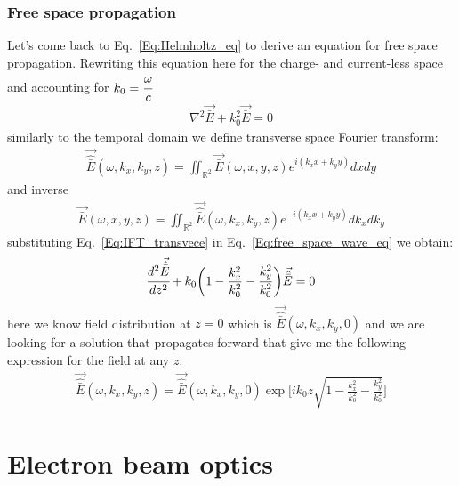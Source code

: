     \subsubsection{Free space propagation}
    Let's come back to Eq.~\ref{Eq:Helmholtz_eq} to derive an equation for free space propagation. Rewriting this equation here for the charge- and current-less space and accounting for $k_0 = \cfrac{\omega}{c}$
    \begin{align}
        \nabla^2 \vec{\bar{E}} + k_0^2 \vec{\bar{E}} = 0
        \label{Eq:free_space_wave_eq}
    \end{align}
    similarly to the temporal domain we define transverse space Fourier transform:
    \begin{align}
        \vec{\hat{\bar{E}}}(\omega, k_x, k_y, z) = \iint_{\mathbb{R}^2} \vec{\bar{E}}(\omega, x, y, z)e^{i (k_x x + k_y y)} dx dy
        \label{Eq:FT_transvece}
    \end{align}
    and inverse
    \begin{align}
        \vec{\bar{E}}(\omega, x, y, z) = \iint_{\mathbb{R}^2} \vec{\hat{\bar{E}}}(\omega, k_x, k_y, z) e^{-i (k_x x + k_y y)} dk_x dk_y
        \label{Eq:IFT_transvece}
    \end{align}
    substituting Eq.~\ref{Eq:IFT_transvece} in Eq.~\ref{Eq:free_space_wave_eq} we obtain:
    \begin{align}
        \cfrac{d^2\vec{\hat{\bar{E}}}}{dz^2} + k_0 \bigg(1 - \frac{k^2_x}{k^2_0} - \frac{k^2_y}{k^2_0}\bigg) \vec{\hat{\bar{E}}} = 0
    \end{align}
    here we know field distribution at $z=0$ which is $\vec{\hat{\bar{E}}}(\omega, k_x, k_y, 0)$ and we are looking for a solution that propagates forward that give me the following expression for the field at any $z$:
    \begin{align}
        \vec{\hat{\bar{E}}}(\omega, k_x, k_y, z) = \vec{\hat{\bar{E}}}(\omega, k_x, k_y, 0)\exp{\bigg[ ik_0 z \sqrt{1 - \frac{k^2_x}{k^2_0} - \frac{k^2_y}{k^2_0}}\bigg]}
    \end{align}

\section{Electron beam optics}

